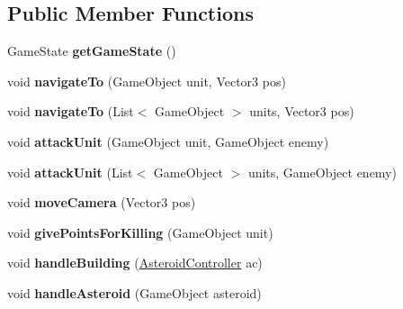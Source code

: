 \subsection*{Public Member Functions}
\begin{DoxyCompactItemize}
\item 
\hypertarget{class_game_controller_a24f3fc5439aa25c87d7a22efa0ca4ff5}{}Game\+State {\bfseries get\+Game\+State} ()\label{class_game_controller_a24f3fc5439aa25c87d7a22efa0ca4ff5}

\item 
\hypertarget{class_game_controller_a7533fd7506ef2ef51f35050cbf109c20}{}void {\bfseries navigate\+To} (Game\+Object unit, Vector3 pos)\label{class_game_controller_a7533fd7506ef2ef51f35050cbf109c20}

\item 
\hypertarget{class_game_controller_a19eacaf7b7a58d12ef03508959eb44d5}{}void {\bfseries navigate\+To} (List$<$ Game\+Object $>$ units, Vector3 pos)\label{class_game_controller_a19eacaf7b7a58d12ef03508959eb44d5}

\item 
\hypertarget{class_game_controller_a28daa03c0d2d957778106d03c9519ccc}{}void {\bfseries attack\+Unit} (Game\+Object unit, Game\+Object enemy)\label{class_game_controller_a28daa03c0d2d957778106d03c9519ccc}

\item 
\hypertarget{class_game_controller_a30a6c11927455a2680e61439844ea9d6}{}void {\bfseries attack\+Unit} (List$<$ Game\+Object $>$ units, Game\+Object enemy)\label{class_game_controller_a30a6c11927455a2680e61439844ea9d6}

\item 
\hypertarget{class_game_controller_ac24bfe50e36d1f80f2bb713b35950da4}{}void {\bfseries move\+Camera} (Vector3 pos)\label{class_game_controller_ac24bfe50e36d1f80f2bb713b35950da4}

\item 
\hypertarget{class_game_controller_a0a08dc740a2404be333418899e702fb9}{}void {\bfseries give\+Points\+For\+Killing} (Game\+Object unit)\label{class_game_controller_a0a08dc740a2404be333418899e702fb9}

\item 
\hypertarget{class_game_controller_af3c1116017242ec65bb53045f32447f6}{}void {\bfseries handle\+Building} (\hyperlink{class_asteroid_controller}{Asteroid\+Controller} ac)\label{class_game_controller_af3c1116017242ec65bb53045f32447f6}

\item 
\hypertarget{class_game_controller_a81d580922a9967dadf5c777c2a9a004f}{}void {\bfseries handle\+Asteroid} (Game\+Object asteroid)\label{class_game_controller_a81d580922a9967dadf5c777c2a9a004f}


\end{DoxyCompactItemize}
